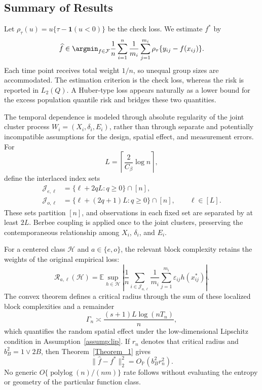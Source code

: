 \documentclass[twoside,11pt]{article}
\newenvironment{revision}{\color{revisionred}}{}
\begin{document}
\subsection{Summary of Results}
\begin{revision}
Let $\rho_\tau(u)=u\{\tau-\mathbf 1(u<0)\}$ be the check loss. We estimate $f^*$ by
\begin{equation}
 \widehat f\in\argmin_{f\in\mathcal F}
 \frac1n\sum_{i=1}^n\frac1{m_i}\sum_{j=1}^{m_i}
 \rho_\tau\{y_{ij}-f(x_{ij})\}.                              \label{loss_quantile}
\end{equation}
Each time point receives total weight $1/n$, so unequal group sizes are accommodated. The estimation criterion is the check loss, whereas the risk is reported in $L_2(Q)$. A Huber-type loss appears naturally as a lower bound for the excess population quantile risk and bridges these two quantities.

The temporal dependence is modeled through absolute regularity of the joint cluster process $W_i=(X_i,\delta_i,E_i)$, rather than through separate and potentially incompatible assumptions for the design, spatial effect, and measurement errors. For
\[
 L=\left\lceil\frac{2}{C_\beta}\log n\right\rceil,
\]
define the interlaced index sets
\begin{align}
 \mathcal J_{e,\ell}&=\{\ell+2qL:q\ge0\}\cap[n],\nonumber\\
 \mathcal J_{o,\ell}&=\{\ell+(2q+1)L:q\ge0\}\cap[n],
 \qquad \ell\in[L].                                         \label{odd_even_indices}
\end{align}
\label{eq:blocks}
These sets partition $[n]$, and observations in each fixed set are separated by at least $2L$. Berbee coupling is applied once to the joint clusters, preserving the contemporaneous relationship among $X_i$, $\delta_i$, and $E_i$.

For a centered class $\mathcal H$ and $a\in\{e,o\}$, the relevant block complexity retains the weights of the original empirical loss:
\[
 \mathcal R_{a,\ell}(\mathcal H)=
 \mathbb E\sup_{h\in\mathcal H}
 \left|\frac1n\sum_{i\in\mathcal J_{a,\ell}}\frac1{m_i}
 \sum_{j=1}^{m_i}\varepsilon_{ij}h(x_{ij}^*)\right|.
\]
The convex theorem defines a critical radius through the sum of these localized block complexities and a remainder
\[
 \Gamma_n\asymp\frac{(s+1)L\log(nT_n)}{n},
\]
which quantifies the random spatial effect under the low-dimensional Lipschitz condition in Assumption~\ref{assump:lip}. If $r_n$ denotes that critical radius and $b_B^2=1\vee2B$, then Theorem~\ref{Theorem_1} gives
\[
 \|\widehat f-f^*\|_2^2=O_{\mathbb P}(b_B^2r_n^2).
\]
No generic $O\{\operatorname{polylog}(n)/(nm)\}$ rate follows without evaluating the entropy or geometry of the particular function class.


\end{revision}
\end{document}
